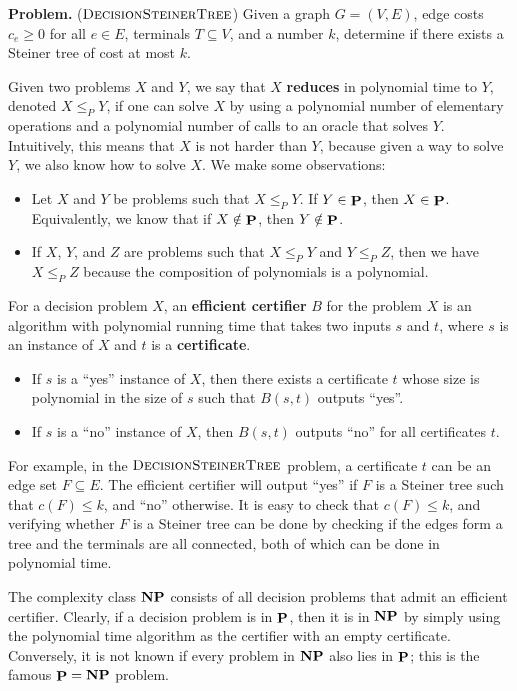 \documentclass{article}
\DeclareMathOperator{\Poly}{{\bf P}}
\DeclareMathOperator{\NP}{{\bf NP}}
\DeclareMathOperator{\DecisionSteinerTree}{\textsc{DecisionSteinerTree}}
\begin{document}
{\color{violet}
{\bf Problem.} ($\DecisionSteinerTree$) Given a graph $G = (V, E)$, 
edge costs $c_e \geq 0$ for all $e \in E$, terminals $T \subseteq V$, 
and a number $k$, determine if there exists a Steiner tree of cost at most $k$.}

Given two problems $X$ and $Y$, we say that $X$ {\bf reduces} in polynomial 
time to $Y$, denoted $X \leq_P Y$, if one can solve $X$ by using 
a polynomial number of elementary operations and a polynomial number 
of calls to an oracle that solves $Y$. Intuitively, this means that 
$X$ is not harder than $Y$, because given a way to solve $Y$, we also know 
how to solve $X$. We make some observations: 
\begin{itemize}
    \item Let $X$ and $Y$ be problems such that $X \leq_P Y$. 
    If $Y \in \Poly$, then $X \in \Poly$. Equivalently, we know that 
    if $X \notin \Poly$, then $Y \notin \Poly$. 
    \item If $X$, $Y$, and $Z$ are problems such that $X \leq_P Y$ and 
    $Y \leq_P Z$, then we have $X \leq_P Z$ because the composition of 
    polynomials is a polynomial. 
\end{itemize}

For a decision problem $X$, an {\bf efficient certifier} $B$ for the problem 
$X$ is an algorithm with polynomial running time that takes two inputs 
$s$ and $t$, where $s$ is an instance of $X$ and $t$ is a {\bf certificate}. 
\begin{itemize}
    \item If $s$ is a ``yes'' instance of $X$, then there exists a 
    certificate $t$ whose size is polynomial in the size of $s$ 
    such that $B(s, t)$ outputs ``yes''.
    \item If $s$ is a ``no'' instance of $X$, then $B(s, t)$ outputs ``no'' 
    for all certificates $t$. 
\end{itemize}

For example, in the $\DecisionSteinerTree$ problem, a certificate $t$ 
can be an edge set $F \subseteq E$. The efficient certifier will output 
``yes'' if $F$ is a Steiner tree such that $c(F) \leq k$, and ``no'' otherwise. 
It is easy to check that $c(F) \leq k$, and verifying whether 
$F$ is a Steiner tree can be done by checking if the edges form a tree 
and the terminals are all connected, both of which can be done in polynomial time.

The complexity class $\NP$ consists of all decision problems that admit 
an efficient certifier. Clearly, if a decision problem is in $\Poly$, 
then it is in $\NP$ by simply using the polynomial time algorithm as the certifier 
with an empty certificate. Conversely, it is not known if every problem 
in $\NP$ also lies in $\Poly$; this is the famous $\Poly = \NP$ problem. 
\end{document}
